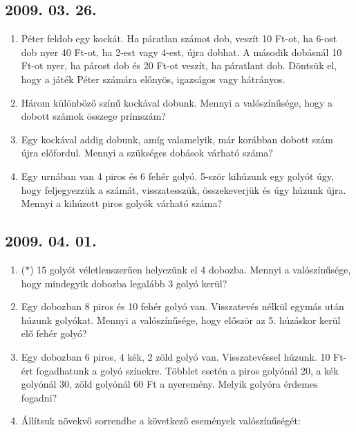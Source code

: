 \subsection*{2009. 03. 26.}
\begin{enumerate}
\item Péter feldob egy kockát. Ha páratlan számot dob, veszít 10 Ft-ot, ha 6-ost dob nyer 40 Ft-ot, ha 2-est vagy 4-est, újra dobhat. A második dobásnál 10 Ft-ot nyer, ha párost dob és 20 Ft-ot veszít, ha páratlant dob. Döntsük el, hogy a játék Péter számára előnyös, igazságos vagy hátrányos.

\item Három különböző színű kockával dobunk. Mennyi a valószínűsége, hogy a dobott számok összege prímszám?

\item Egy kockával addig dobunk, amíg valamelyik, már korábban dobott szám újra előfordul. Mennyi a szükséges dobások várható száma?

\item Egy urnában van 4 piros és 6 fehér golyó. 5-ször kihúzunk egy golyót úgy, hogy feljegyezzük a számát, visszatesszük, összekeverjük és úgy húzunk újra. Mennyi a kihúzott piros golyók várható száma?
\end{enumerate}
\subsection*{2009. 04. 01.}
\begin{enumerate}
\item ($*$) 15 golyót véletlenszerűen helyezünk el 4 dobozba. Mennyi a valószínűsége, hogy mindegyik dobozba legalább 3 golyó kerül? 

\item Egy dobozban 8 piros és 10 fehér golyó van. Visszatevés nélkül  egymás után húzunk golyókat. Mennyi a valószínűsége, hogy először az 5. húzáskor kerül elő fehér golyó?

\item Egy dobozban 6 piros, 4 kék, 2 zöld golyó van. Visszatevéssel húzunk. 10 Ft-ért fogadhatunk a golyó színekre. Többlet esetén a piros golyónál 20, a kék golyónál 30, zöld golyónál 60 Ft a nyeremény. Melyik golyóra érdemes fogadni? 

\item Állítsuk növekvő sorrendbe a következő események valószínűségét:
\end{enumerate}
